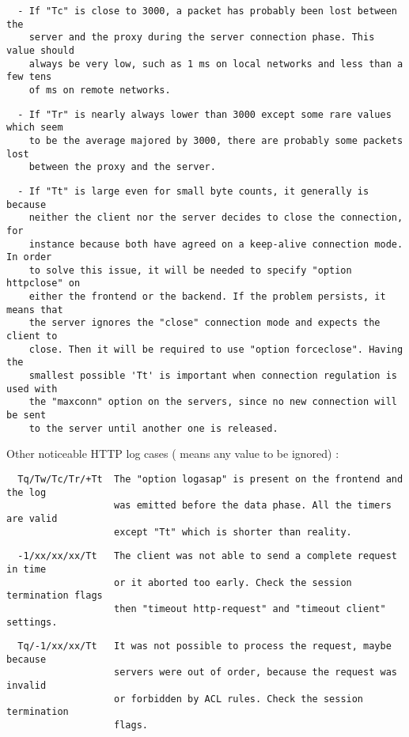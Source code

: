 \begin{verbatim}
  - If "Tc" is close to 3000, a packet has probably been lost between the
    server and the proxy during the server connection phase. This value should
    always be very low, such as 1 ms on local networks and less than a few tens
    of ms on remote networks.
\end{verbatim}

\begin{verbatim}
  - If "Tr" is nearly always lower than 3000 except some rare values which seem
    to be the average majored by 3000, there are probably some packets lost
    between the proxy and the server.
\end{verbatim}

\begin{verbatim}
  - If "Tt" is large even for small byte counts, it generally is because
    neither the client nor the server decides to close the connection, for
    instance because both have agreed on a keep-alive connection mode. In order
    to solve this issue, it will be needed to specify "option httpclose" on
    either the frontend or the backend. If the problem persists, it means that
    the server ignores the "close" connection mode and expects the client to
    close. Then it will be required to use "option forceclose". Having the
    smallest possible 'Tt' is important when connection regulation is used with
    the "maxconn" option on the servers, since no new connection will be sent
    to the server until another one is released.
\end{verbatim}


Other noticeable HTTP log cases ( means any value to be ignored) :

\begin{verbatim}
  Tq/Tw/Tc/Tr/+Tt  The "option logasap" is present on the frontend and the log
                   was emitted before the data phase. All the timers are valid
                   except "Tt" which is shorter than reality.
\end{verbatim}

\begin{verbatim}
  -1/xx/xx/xx/Tt   The client was not able to send a complete request in time
                   or it aborted too early. Check the session termination flags
                   then "timeout http-request" and "timeout client" settings.
\end{verbatim}

\begin{verbatim}
  Tq/-1/xx/xx/Tt   It was not possible to process the request, maybe because
                   servers were out of order, because the request was invalid
                   or forbidden by ACL rules. Check the session termination
                   flags.
\end{verbatim}

